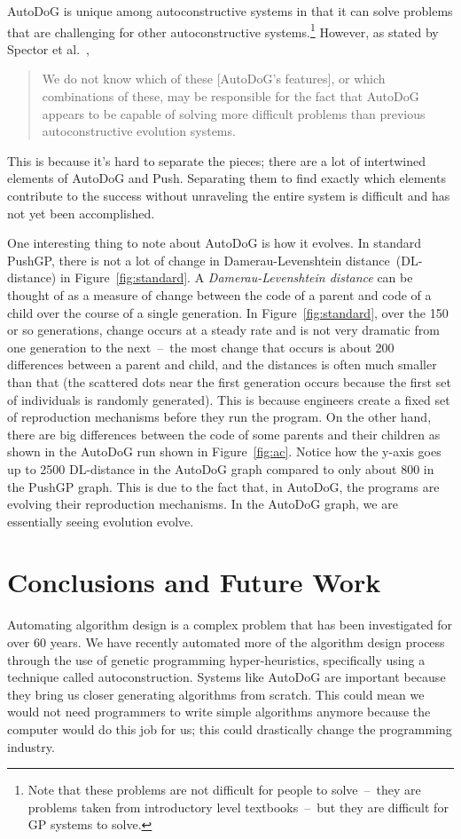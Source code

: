 \documentclass{sig-alternate}
\begin{document}
AutoDoG is unique among autoconstructive systems in that it can solve problems that are challenging for other autoconstructive systems.\footnote{Note that these problems are not difficult for people to solve~--~they are problems taken from introductory level textbooks~--~but they are difficult for GP systems to solve.} However, as stated by Spector et al.~\cite{spector:2016},
\begin{quotation}
	We do not know which of these [AutoDoG's features], or which combinations of these, may be responsible for the fact that AutoDoG appears to be capable of solving more difficult problems than previous autoconstructive evolution systems.
\end{quotation}
This is because it's hard to separate the pieces; there are a lot of intertwined elements of AutoDoG and Push. Separating them to find exactly which elements contribute to the success without unraveling the entire system is difficult and has not yet been accomplished.

One interesting thing to note about AutoDoG is how it evolves. In standard PushGP, there is not a lot of change in Damerau-Levenshtein distance~(DL-distance) in Figure~\ref{fig:standard}. A \textit{Damerau-Levenshtein distance} can be thought of as a measure of change between the code of a parent and code of a child over the course of a single generation. In Figure~\ref{fig:standard}, over the 150 or so generations, change occurs at a steady rate and is not very dramatic from one generation to the next~--~the most change that occurs is about 200 differences between a parent and child, and the distances is often much smaller than that (the scattered dots near the first generation occurs because the first set of individuals is randomly generated). This is because engineers create a fixed set of reproduction mechanisms before they run the program. On the other hand, there are big differences between the code of some parents and their children as shown in the AutoDoG run shown in Figure~\ref{fig:ac}. Notice how the y-axis goes up to 2500 DL-distance in the AutoDoG graph compared to only about 800 in the PushGP graph. This is due to the fact that, in AutoDoG, the programs are evolving their reproduction mechanisms. In the AutoDoG graph, we are essentially seeing evolution evolve.

\section{Conclusions and Future Work}
\label{sec:conclusion}
Automating algorithm design is a complex problem that has been investigated for over 60 years. We have recently automated more of the algorithm design process through the use of genetic programming hyper-heuristics, specifically using a technique called autoconstruction. Systems like AutoDoG are important because they bring us closer generating algorithms from scratch. This could mean we would not need programmers to write simple algorithms anymore because the computer would do this job for us; this could drastically change the programming industry.
\end{document}
